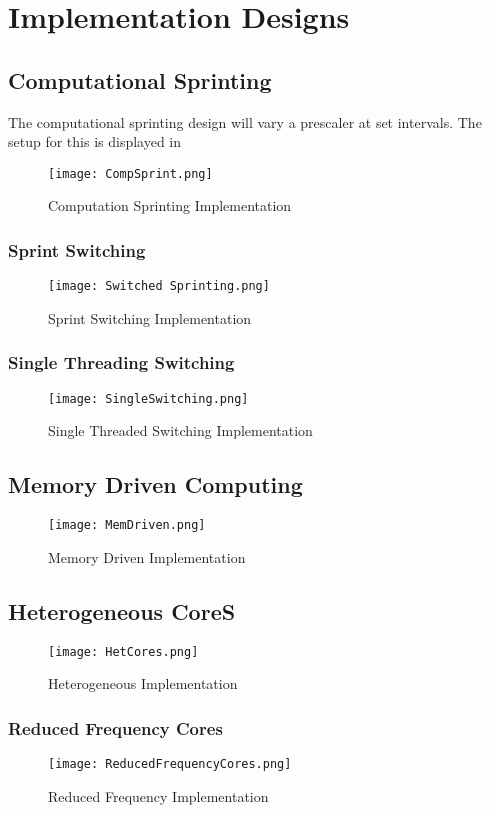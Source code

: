 \section{Implementation Designs}
	\subsection{Computational Sprinting}
		The computational sprinting design will vary a prescaler at set intervals. The setup for this is displayed in 
	
	\begin{figure}
		\centering
		\texttt{[image: CompSprint.png]}
		\caption{Computation Sprinting Implementation}
		\label{CompSprint}
	\end{figure}
	
	\subsubsection{Sprint Switching}
	\begin{figure}
		\centering
		\texttt{[image: Switched Sprinting.png]}
		\caption{Sprint Switching Implementation}
		\label{Sprint Switching Implementation}
	\end{figure}
	
	\subsubsection{Single Threading Switching}
	\begin{figure}
		\centering
		\texttt{[image: SingleSwitching.png]}
		\caption{Single Threaded Switching Implementation}
		\label{Single Threaded Switching}
	\end{figure}

	\subsection{Memory Driven Computing}
	\begin{figure}
		\centering
		\texttt{[image: MemDriven.png]}
		\caption{Memory Driven Implementation}
		\label{MemDriven}
	\end{figure}

	\subsection{Heterogeneous CoreS}
	\begin{figure}
		\centering
		\texttt{[image: HetCores.png]}
		\caption{Heterogeneous Implementation}
		\label{HetCores}
	\end{figure}

	\subsubsection{Reduced Frequency Cores}
	\begin{figure}
		\centering
		\texttt{[image: ReducedFrequencyCores.png]}
		\caption{Reduced Frequency Implementation}
		\label{ReducedFreqCores}
	\end{figure}



	
